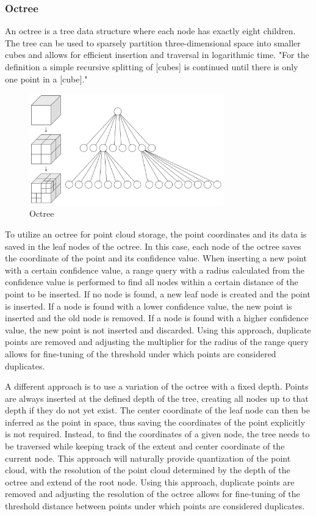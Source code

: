 \subsubsection{Octree}
An octree is a tree data structure where each node has exactly eight children.
The tree can be used to sparsely partition three-dimensional space into smaller cubes and allows for efficient
insertion and traversal in logarithmic time.
"For the definition a simple recursive splitting of [cubes] is continued until there is only one point in a [cube]."
\parencite{gabriel_zachmann_geometric_2002}

\begin{figure}[h]
    \centering
    \includegraphics[width=0.75\textwidth]{images/octree}
    \caption{Octree}
    \label{fig:octrree}
\end{figure}

To utilize an octree for point cloud storage, the point coordinates and its data is saved in the leaf nodes of the octree.
In this case, each node of the octree saves the coordinate of the point and its confidence value.
When inserting a new point with a certain confidence value, a range query with a radius calculated from the confidence value
is performed to find all nodes within a certain distance of the point to be inserted.
If no node is found, a new leaf node is created and the point is inserted.
If a node is found with a lower confidence value, the new point is inserted and the old node is removed.
If a node is found with a higher confidence value, the new point is not inserted and discarded.
Using this approach, duplicate points are removed and adjusting the multiplier for the radius of the range query
allows for fine-tuning of the threshold under which points are considered duplicates.

A different approach is to use a variation of the octree with a fixed depth.
Points are always inserted at the defined depth of the tree, creating all nodes up to that depth if they do not yet exist.
The center coordinate of the leaf node can then be inferred as the point in space,
thus saving the coordinates of the point explicitly is not required.
Instead, to find the coordinates of a given node, the tree needs to be traversed while keeping track of
the extent and center coordinate of the current node.
This approach will naturally provide quantization of the point cloud, with the resolution of the point cloud
determined by the depth of the octree and extend of the root node.
Using this approach, duplicate points are removed and adjusting the resolution of the octree
allows for fine-tuning of the threshold distance between points under which points are considered duplicates.

